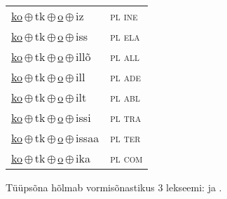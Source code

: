 \begin{minipage}{\textwidth}
\begin{sideways}
\begin{tabular}{l l}
\underline{ko}\,$\oplus$\,tk\,$\oplus$\,\underline{o}\,$\oplus$\,iz & \textsc{ pl ine } \\
\underline{ko}\,$\oplus$\,tk\,$\oplus$\,\underline{o}\,$\oplus$\,iss & \textsc{ pl ela } \\
\underline{ko}\,$\oplus$\,tk\,$\oplus$\,\underline{o}\,$\oplus$\,illõ & \textsc{ pl all } \\
\underline{ko}\,$\oplus$\,tk\,$\oplus$\,\underline{o}\,$\oplus$\,ill & \textsc{ pl ade } \\
\underline{ko}\,$\oplus$\,tk\,$\oplus$\,\underline{o}\,$\oplus$\,ilt & \textsc{ pl abl } \\
\underline{ko}\,$\oplus$\,tk\,$\oplus$\,\underline{o}\,$\oplus$\,issi & \textsc{ pl tra } \\
\underline{ko}\,$\oplus$\,tk\,$\oplus$\,\underline{o}\,$\oplus$\,issaa & \textsc{ pl ter } \\
\underline{ko}\,$\oplus$\,tk\,$\oplus$\,\underline{o}\,$\oplus$\,ika & \textsc{ pl com } \\
\end{tabular}
\end{sideways}
\label{tab:tüüpsõnamall-kotko}

\end{minipage}

 
\vspace{1em}
\noindent Tüüpsõna hõlmab vormisõnastikus 3 lekseemi:  ja .
